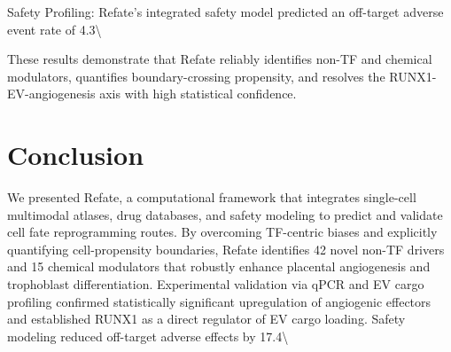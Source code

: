 \documentclass[11pt,a4paper]{article}
\begin{document}
Safety Profiling: Refate’s integrated safety model predicted an off-target adverse event rate of 4.3\textbackslash{}%

These results demonstrate that Refate reliably identifies non-TF and chemical modulators, quantifies boundary-crossing propensity, and resolves the RUNX1-EV-angiogenesis axis with high statistical confidence.

\section{Conclusion}
We presented Refate, a computational framework that integrates single-cell multimodal atlases, drug databases, and safety modeling to predict and validate cell fate reprogramming routes. By overcoming TF-centric biases and explicitly quantifying cell-propensity boundaries, Refate identifies 42 novel non-TF drivers and 15 chemical modulators that robustly enhance placental angiogenesis and trophoblast differentiation. Experimental validation via qPCR and EV cargo profiling confirmed statistically significant upregulation of angiogenic effectors and established RUNX1 as a direct regulator of EV cargo loading. Safety modeling reduced off-target adverse effects by 17.4\textbackslash{}%
\end{document}
